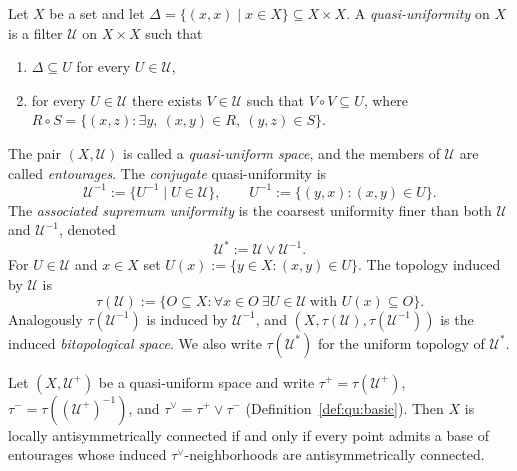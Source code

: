 \documentclass[10pt,a4paper]{amsart}
\begin{document}
\begin{definition}
\label{def:qu:basic}
Let $X$ be a set and let
$\Delta=\{(x,x)\mid x\in X\}\subseteq X\times X$. A \emph{quasi-uniformity}
on $X$ is a filter $\mathcal{U}$ on $X\times X$ such that
\begin{enumerate}[label=\textup{(\roman*)}]
\item $\Delta\subseteq U$ for every $U\in\mathcal{U}$,
\item for every $U\in\mathcal{U}$ there exists $V\in\mathcal{U}$ such
that $V\circ V\subseteq U$, where
$R\circ S=\{(x,z):\exists y,\ (x,y)\in R,\ (y,z)\in S\}$.
\end{enumerate}
The pair $(X,\mathcal{U})$ is called a \emph{quasi-uniform space}, and
the members of $\mathcal{U}$ are called \emph{entourages}. The
\emph{conjugate} quasi-uniformity is
\[
\mathcal{U}^{-1}:=\{U^{-1}\mid U\in\mathcal{U}\},
\qquad
U^{-1}:=\{(y,x):(x,y)\in U\}.
\]
The \emph{associated supremum uniformity} is the coarsest uniformity
finer than both $\mathcal{U}$ and $\mathcal{U}^{-1}$, denoted
\[
\mathcal{U}^{*}:=\mathcal{U}\vee\mathcal{U}^{-1}.
\]
For $U\in\mathcal{U}$ and $x\in X$ set $U(x):=\{y\in X:(x,y)\in U\}$.
The topology induced by $\mathcal{U}$ is
\[
\tau(\mathcal{U})
:=\{O\subseteq X:\forall x\in O\ \exists U\in\mathcal{U}\ \text{with }
U(x)\subseteq O\}.
\]
Analogously $\tau(\mathcal{U}^{-1})$ is induced by $\mathcal{U}^{-1}$,
and $(X,\tau(\mathcal{U}),\tau(\mathcal{U}^{-1}))$ is the induced
\emph{bitopological space}. We also write $\tau(\mathcal{U}^{*})$ for
the uniform topology of $\mathcal{U}^{*}$.
\end{definition}

\begin{theorem}
\label{thm:quni-characterization}
Let $(X,\mathcal U^{+})$ be a quasi-uniform space and write
$\tau^{+}=\tau(\mathcal U^{+})$, $\tau^{-}=\tau((\mathcal U^{+})^{-1})$,
and $\tau^\vee=\tau^{+}\vee\tau^{-}$ (Definition~\ref{def:qu:basic}).
Then $X$ is locally antisymmetrically connected if and only if every
point admits a base of entourages whose induced $\tau^\vee$-neighborhoods
are antisymmetrically connected.
\end{theorem}
\end{document}
